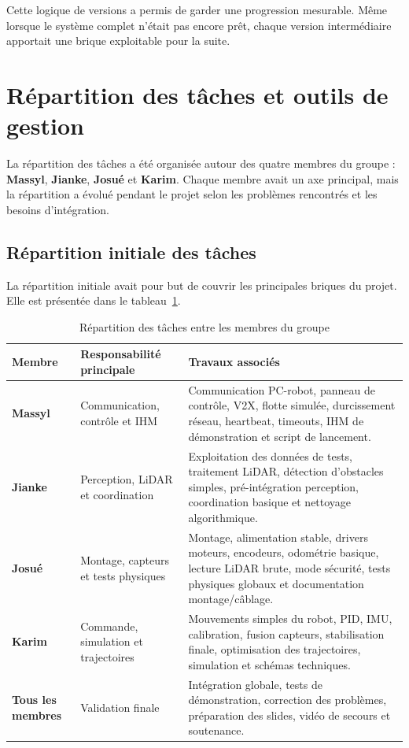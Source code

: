 \documentclass[11pt,a4paper]{report}
\begin{document}
Cette logique de versions a permis de garder une progression mesurable. Même lorsque le système complet n'était pas encore prêt, chaque version intermédiaire apportait une brique exploitable pour la suite.

\section{Répartition des tâches et outils de gestion}

La répartition des tâches a été organisée autour des quatre membres du groupe : \textbf{Massyl}, \textbf{Jianke}, \textbf{Josué} et \textbf{Karim}. Chaque membre avait un axe principal, mais la répartition a évolué pendant le projet selon les problèmes rencontrés et les besoins d'intégration.

\subsection{Répartition initiale des tâches}

La répartition initiale avait pour but de couvrir les principales briques du projet. Elle est présentée dans le tableau~\ref{tab:repartition_taches}.

\begin{table}[H]
\centering
\small
\renewcommand{\arraystretch}{1.25}
\begin{tabular}{|p{3cm}|p{4.4cm}|p{7cm}|}
\hline
\textbf{Membre} & \textbf{Responsabilité principale} & \textbf{Travaux associés} \\
\hline
\textbf{Massyl} &
Communication, contrôle et IHM &
Communication PC-robot, panneau de contrôle, V2X, flotte simulée, durcissement réseau, heartbeat, timeouts, IHM de démonstration et script de lancement. \\
\hline
\textbf{Jianke} &
Perception, LiDAR et coordination &
Exploitation des données de tests, traitement LiDAR, détection d'obstacles simples, pré-intégration perception, coordination basique et nettoyage algorithmique. \\
\hline
\textbf{Josué} &
Montage, capteurs et tests physiques &
Montage, alimentation stable, drivers moteurs, encodeurs, odométrie basique, lecture LiDAR brute, mode sécurité, tests physiques globaux et documentation montage/câblage. \\
\hline
\textbf{Karim} &
Commande, simulation et trajectoires &
Mouvements simples du robot, PID, IMU, calibration, fusion capteurs, stabilisation finale, optimisation des trajectoires, simulation et schémas techniques. \\
\hline
\textbf{Tous les membres} &
Validation finale &
Intégration globale, tests de démonstration, correction des problèmes, préparation des slides, vidéo de secours et soutenance. \\
\hline
\end{tabular}
\caption{Répartition des tâches entre les membres du groupe}
\label{tab:repartition_taches}
\end{table}
\end{document}
